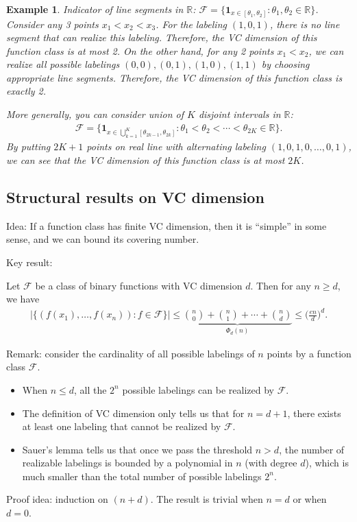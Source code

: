 \documentclass[11pt,letterpaper]{article}
\newtheorem{example}{Example}
\numberwithin{theorem}{lecture}
\numberwithin{proposition}{lecture}
\numberwithin{lemma}{lecture}
\numberwithin{claim}{lecture}
\numberwithin{corollary}{lecture}
\numberwithin{definition}{lecture}
\numberwithin{conjecture}{lecture}
\numberwithin{remark}{lecture}
\numberwithin{example}{lecture}
\numberwithin{equation}{lecture}
\begin{document}
\begin{example}\upshape Indicator of line segments in $\mathbb{R}$: $\mathcal{F} = \{\bm{1}_{x \in [\theta_1, \theta_2]}: \theta_1, \theta_2 \in \mathbb{R}\}$. Consider any 3 points $x_1 < x_2 < x_3$. For the labeling $(1, 0, 1)$, there is no line segment that can realize this labeling. Therefore, the VC dimension of this function class is at most 2. On the other hand, for any 2 points $x_1 < x_2$, we can realize all possible labelings $(0, 0), (0, 1), (1, 0), (1, 1)$ by choosing appropriate line segments. Therefore, the VC dimension of this function class is exactly 2.

More generally, you can consider union of $K$ disjoint intervals in $\mathbb{R}$:
\begin{align*}
  \mathcal{F} = \Big\{\bm{1}_{x \in \bigcup_{k = 1}^K [\theta_{2k - 1}, \theta_{2k}]}: \theta_1 < \theta_2 < \cdots < \theta_{2K} \in \mathbb{R}\Big\}.
\end{align*}
By putting $2K + 1$ points on real line with alternating labeling $(1, 0, 1, 0, \ldots, 0, 1)$, we can see that the VC dimension of this function class is at most $2K$.
\end{example}

\subsection{Structural results on VC dimension}
Idea: If a function class has finite VC dimension, then it is ``simple'' in some sense, and we can bound its covering number.

Key result:
\begin{theorem}
  Let $\mathcal{F}$ be a class of binary functions with VC dimension $d$. Then for any $n \geq d$, we have
  \begin{align*}
    \Big| \Big\{ (f (x_1), \ldots, f (x_n)) : f \in \mathcal{F} \Big\} \Big| \leq \underbrace{\binom{n}{0} + \binom{n}{1} + \cdots + \binom{n}{d}}_{\Phi_d (n)} \leq \Big( \frac{e n}{d} \Big)^d.
  \end{align*}
\end{theorem}
Remark: consider the cardinality of all possible labelings of $n$ points by a function class $\mathcal{F}$. 
\begin{itemize}
  \item When $n \leq d$, all the $2^n$ possible labelings can be realized by $\mathcal{F}$.
  \item The definition of VC dimension only tells us that for $n = d + 1$, there exists at least one labeling that cannot be realized by $\mathcal{F}$.
  \item Sauer's lemma tells us that once we pass the threshold $n > d$, the number of realizable labelings is bounded by a polynomial in $n$ (with degree $d$), which is much smaller than the total number of possible labelings $2^n$.
\end{itemize}
Proof idea: induction on $(n + d)$. The result is trivial when $n = d$ or when $d = 0$.
\end{document}
